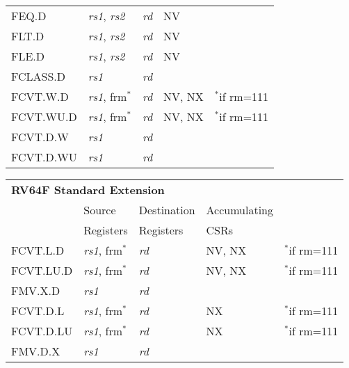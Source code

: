 \begin{tabular}{p{3cm}|p{25mm}|p{3cm}|p{4cm}|p{4cm}}
   \cline{2-4}
   FEQ.D & {\em rs1}, {\em rs2} & {\em rd} & NV &   \\
   \cline{2-4}
   FLT.D & {\em rs1}, {\em rs2} & {\em rd} & NV &   \\
   \cline{2-4}
   FLE.D & {\em rs1}, {\em rs2} & {\em rd} & NV &   \\
   \cline{2-4}
   FCLASS.D & {\em rs1} & {\em rd} &   & \\
   \cline{2-4}
   FCVT.W.D & {\em rs1}, frm$^*$ & {\em rd} & NV, NX & $^*$if rm=111  \\
   \cline{2-4}
   FCVT.WU.D & {\em rs1}, frm$^*$ & {\em rd} & NV, NX & $^*$if rm=111  \\
   \cline{2-4}
   FCVT.D.W & {\em rs1} & {\em rd} &  & \\
   \cline{2-4}
   FCVT.D.WU & {\em rs1} & {\em rd} &  & \\
   \cline{2-4}
\end{tabular}

\begin{tabular}{p{3cm}|p{25mm}|p{3cm}|p{4cm}|p{4cm}}
  \multicolumn{4}{l}{\bf RV64F Standard Extension} \\
  \cline{2-4}
   & Source    & Destination & Accumulating \\
   & Registers & Registers   & CSRs \\
  \cline{2-4}
   FCVT.L.D & {\em rs1}, frm$^*$ & {\em rd} & NV, NX & $^*$if rm=111  \\
   \cline{2-4}
   FCVT.LU.D & {\em rs1}, frm$^*$ & {\em rd} & NV, NX & $^*$if rm=111  \\
   \cline{2-4}
   FMV.X.D & {\em rs1} & {\em rd} &   & \\
   \cline{2-4}
   FCVT.D.L & {\em rs1}, frm$^*$ & {\em rd} & NX & $^*$if rm=111  \\
   \cline{2-4}
   FCVT.D.LU & {\em rs1}, frm$^*$ & {\em rd} & NX & $^*$if rm=111  \\
   \cline{2-4}
   FMV.D.X & {\em rs1} & {\em rd} &   & \\
   \cline{2-4}
\end{tabular}
